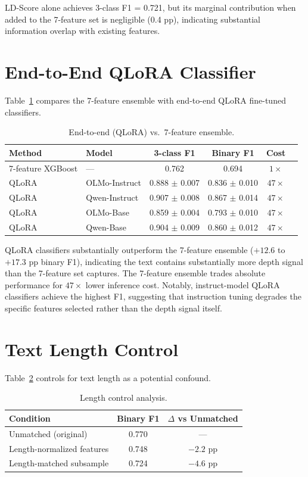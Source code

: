 \documentclass[11pt,a4paper]{article}
\begin{document}
LD-Score alone achieves 3-class F1 = 0.721, but its marginal contribution when added to the 7-feature set is negligible (0.4 pp), indicating substantial information overlap with existing features.

\section{End-to-End QLoRA Classifier}
\label{app:qlora}

Table~\ref{tab:qlora} compares the 7-feature ensemble with end-to-end QLoRA fine-tuned classifiers.

\begin{table}[h]
\centering
\small
\caption{End-to-end (QLoRA) vs.\ 7-feature ensemble.}
\label{tab:qlora}
\begin{tabular}{llcccc}
\toprule
Method & Model & 3-class F1 & Binary F1 & Cost \\
\midrule
7-feature XGBoost & --- & 0.762 & 0.694 & $1\times$ \\
QLoRA & OLMo-Instruct & 0.888 $\pm$ 0.007 & 0.836 $\pm$ 0.010 & $47\times$ \\
QLoRA & Qwen-Instruct & 0.907 $\pm$ 0.008 & 0.867 $\pm$ 0.014 & $47\times$ \\
QLoRA & OLMo-Base & 0.859 $\pm$ 0.004 & 0.793 $\pm$ 0.010 & $47\times$ \\
QLoRA & Qwen-Base & 0.904 $\pm$ 0.009 & 0.860 $\pm$ 0.012 & $47\times$ \\
\bottomrule
\end{tabular}
\end{table}

QLoRA classifiers substantially outperform the 7-feature ensemble ($+12.6$ to $+17.3$ pp binary F1), indicating the text contains substantially more depth signal than the 7-feature set captures. The 7-feature ensemble trades absolute performance for $47\times$ lower inference cost. Notably, instruct-model QLoRA classifiers achieve the highest F1, suggesting that instruction tuning degrades the specific features selected rather than the depth signal itself.

\section{Text Length Control}
\label{app:length}

Table~\ref{tab:length} controls for text length as a potential confound.

\begin{table}[h]
\centering
\small
\caption{Length control analysis.}
\label{tab:length}
\begin{tabular}{lcc}
\toprule
Condition & Binary F1 & $\Delta$ vs Unmatched \\
\midrule
Unmatched (original) & 0.770 & --- \\
Length-normalized features & 0.748 & $-2.2$ pp \\
Length-matched subsample & 0.724 & $-4.6$ pp \\
\bottomrule
\end{tabular}
\end{table}
\end{document}
